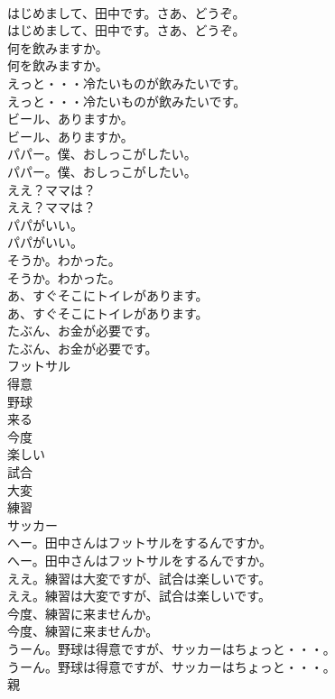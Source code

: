 \documentclass[8pt]{extreport}
\begin{document}
\begin{CJK}{UTF8}{min}
\\	はじめまして、田中です。さあ、どうぞ。	
\\	はじめまして、田中です。さあ、どうぞ。 
\\	何を飲みますか。	
\\	何を飲みますか。 
\\	えっと・・・冷たいものが飲みたいです。	
\\	えっと・・・冷たいものが飲みたいです。 
\\	ビール、ありますか。	
\\	ビール、ありますか。 
\\	パパー。僕、おしっこがしたい。	
\\	パパー。僕、おしっこがしたい。 
\\	ええ？ママは？	
\\	ええ？ママは？ 
\\	パパがいい。	
\\	パパがいい。 
\\	そうか。わかった。	
\\	そうか。わかった。 
\\	あ、すぐそこにトイレがあります。	
\\	あ、すぐそこにトイレがあります。 
\\	たぶん、お金が必要です。	
\\	たぶん、お金が必要です。 
\\	フットサル
\\	得意
\\	野球
\\	来る
\\	今度
\\	楽しい
\\	試合
\\	大変
\\	練習
\\	サッカー
\\	へー。田中さんはフットサルをするんですか。	
\\	へー。田中さんはフットサルをするんですか。 
\\	ええ。練習は大変ですが、試合は楽しいです。	
\\	ええ。練習は大変ですが、試合は楽しいです。 
\\	今度、練習に来ませんか。	
\\	今度、練習に来ませんか。 
\\	うーん。野球は得意ですが、サッカーはちょっと・・・。	
\\	うーん。野球は得意ですが、サッカーはちょっと・・・。 
\\	親

\end{CJK}
\end{document}
